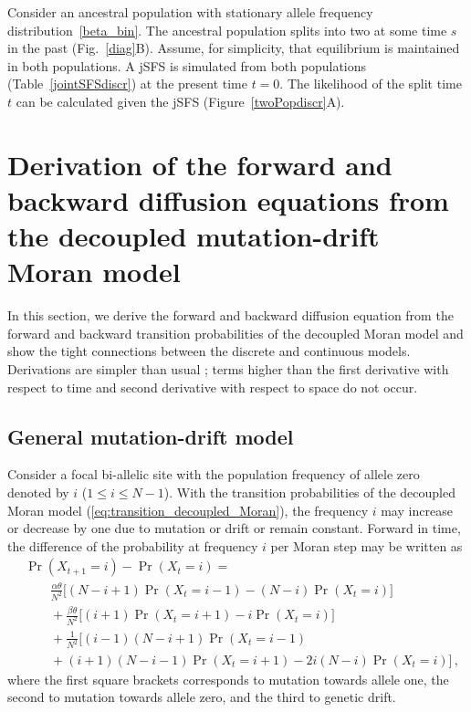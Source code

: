 \documentclass[preprint]{elsarticle}
\newcommand\x[1]{\ensuremath{X_{#1}}}
\begin{document}
Consider an ancestral population with stationary allele frequency distribution~\eqref{beta_bin}. The ancestral population splits into two at some time $s$ in the past (Fig.~\ref{diag}B). Assume, for simplicity, that equilibrium is maintained in both populations. A jSFS is simulated from both populations (Table~\ref{jointSFSdiscr}) at the present time $t=0$. The likelihood of the split time $t$ can be calculated given the jSFS (Figure~\ref{twoPopdiscr}A).


\section{Derivation of the forward and backward diffusion equations from the decoupled mutation-drift Moran model}\label{diffDer}

In this section, we derive the forward and backward diffusion equation from the forward and backward transition probabilities of the decoupled Moran model and show the tight connections between the discrete and continuous models. Derivations are simpler than usual \citep{Ewen04}; terms higher than the first derivative with respect to time and second derivative with respect to space do not occur. 

\subsection{General mutation-drift model}
Consider a focal bi-allelic site with the population frequency of allele zero denoted by $i$ ($1 \leq i \leq N-1$). With the transition probabilities of the decoupled Moran model (\ref{eq:transition_decoupled_Moran}), the frequency $i$ may increase or decrease by one due to mutation or drift or remain constant. Forward in time, the difference of the probability at frequency $i$ per Moran step may be written as
\begin{equation}\label{eq:forw_discr_mutation}
\begin{split}
&\Pr(\x{t+1}=i)-\Pr(\x{t}=i) = \\
&\qquad \frac{\alpha\theta}{N^2} \bigg[(N-i+1)\Pr(\x{t}=i-1) - (N-i)\Pr(\x{t}=i)\bigg]\\
&\qquad+\frac{\beta\theta}{N^2} \bigg[(i+1)\Pr(\x{t}=i+1) - i\Pr(\x{t}=i)\bigg]\\
&\qquad+\frac1{N^2}\bigg[(i-1)(N-i+1)\Pr(\x{t}=i-1) \\
&\qquad+ (i+1)(N-i-1)\Pr(\x{t}=i+1)-2i(N-i)\Pr(\x{t}=i)\bigg]\,,
\end{split}
\end{equation}
where the first square brackets corresponds to mutation towards allele one, the second to mutation towards allele zero, and the third to genetic drift.
\end{document}
